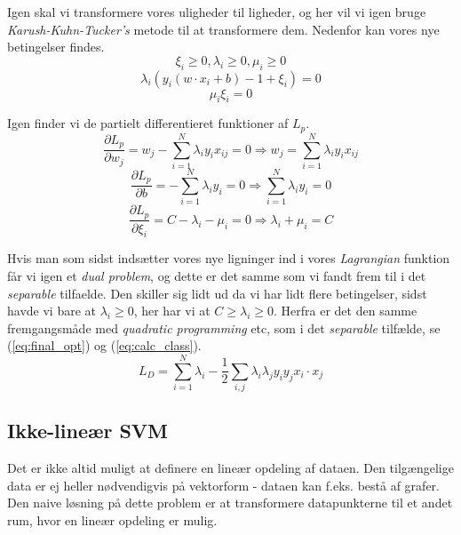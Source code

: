 \documentclass{article}
\begin{document}
Igen skal vi transformere vores uligheder til ligheder, og her vil vi igen bruge \textit{Karush-Kuhn-Tucker's} metode til at transformere dem. Nedenfor kan vores nye betingelser findes.
\begin{equation}
\label{eq:slack_constraint_lambda_i1}
\xi_i \geq 0, \lambda_i \geq 0, \mu_i \geq 0
\end{equation}
\begin{equation}
\label{eq:slack_constraint_lambda_i2}
\lambda_i(y_i(w \cdot x_i + b) - 1 + \xi_i) = 0
\end{equation}
\begin{equation}
\label{eq:slack_constraint_lambda_i3}
\mu_i \xi_i = 0
\end{equation}

Igen finder vi de partielt differentieret funktioner af $L_p$.
\begin{equation}
\label{eq:slack_partial_L_pw}
\frac{\partial L_p}{\partial w_j} = w_j - \sum\limits_{i=1}^N \lambda_i y_i x_{ij} = 0 \Rightarrow w_j = \sum\limits_{i=1}^N \lambda_i y_i x_{ij}
\end{equation}
\begin{equation}
\label{eq:slack_partial_L_pb}
\frac{\partial L_p}{\partial b} = - \sum\limits_{i=1}^N \lambda_i y_i = 0 \Rightarrow \sum\limits_{i=1}^N \lambda_i y_i = 0
\end{equation}
\begin{equation}
\label{eq:slack_partial_L_pxi}
\frac{\partial L_p}{\partial \xi_i} = C - \lambda_i - \mu_i = 0 \Rightarrow \lambda_i + \mu_i = C
\end{equation}

Hvis man som sidst indsætter vores nye ligninger ind i vores \textit{Lagrangian} funktion får vi igen et \textit{dual problem}, og dette er det samme som vi fandt frem til i det \textit{separable} tilfaelde. Den skiller sig lidt ud da vi har lidt flere betingelser, sidst havde vi bare at $\lambda_i \geq 0$, her har vi at $C \geq \lambda_i \geq 0$. Herfra er det den samme fremgangsmåde med \textit{quadratic programming} etc, som i det \textit{separable} tilfælde, se (\ref{eq:final_opt}) og (\ref{eq:calc_class}).
\begin{equation}
\label{eq:slack_L_D}
L_D = \sum\limits_{i=1}^N \lambda_i - \frac{1}{2}\sum\limits_{i,j}\lambda_i \lambda_j y_i y_j x_i \cdot x_j
\end{equation}

\subsection{Ikke-lineær SVM}
Det er ikke altid muligt at definere en lineær opdeling af dataen. Den tilgængelige data er ej heller nødvendigvis på vektorform - dataen kan f.eks. bestå af grafer. Den naive løsning på dette problem er at transformere datapunkterne til et andet rum, hvor en lineær opdeling er mulig.
\end{document}
